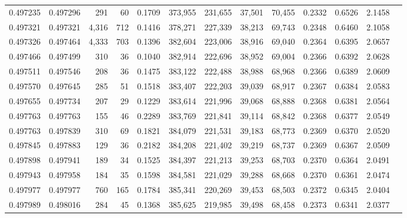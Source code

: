 \begin{tabular}{rrrrrrrrrrrrr}
0.497235 & 0.497296 &   291 &    60 &                                     0.1709 & 373,955 & 231,655 &  37,501 &  70,455 & 0.2332 & 0.6526 & 2.1458 \\
0.497321 & 0.497321 & 4,316 &   712 &                                     0.1416 & 378,271 & 227,339 &  38,213 &  69,743 & 0.2348 & 0.6460 & 2.1058 \\
0.497326 & 0.497464 & 4,333 &   703 &                                     0.1396 & 382,604 & 223,006 &  38,916 &  69,040 & 0.2364 & 0.6395 & 2.0657 \\
0.497466 & 0.497499 &   310 &    36 &                                     0.1040 & 382,914 & 222,696 &  38,952 &  69,004 & 0.2366 & 0.6392 & 2.0628 \\
0.497511 & 0.497546 &   208 &    36 &                                     0.1475 & 383,122 & 222,488 &  38,988 &  68,968 & 0.2366 & 0.6389 & 2.0609 \\
0.497570 & 0.497645 &   285 &    51 &                                     0.1518 & 383,407 & 222,203 &  39,039 &  68,917 & 0.2367 & 0.6384 & 2.0583 \\
0.497655 & 0.497734 &   207 &    29 &                                     0.1229 & 383,614 & 221,996 &  39,068 &  68,888 & 0.2368 & 0.6381 & 2.0564 \\
0.497763 & 0.497763 &   155 &    46 &                                     0.2289 & 383,769 & 221,841 &  39,114 &  68,842 & 0.2368 & 0.6377 & 2.0549 \\
0.497763 & 0.497839 &   310 &    69 &                                     0.1821 & 384,079 & 221,531 &  39,183 &  68,773 & 0.2369 & 0.6370 & 2.0520 \\
0.497845 & 0.497883 &   129 &    36 &                                     0.2182 & 384,208 & 221,402 &  39,219 &  68,737 & 0.2369 & 0.6367 & 2.0509 \\
0.497898 & 0.497941 &   189 &    34 &                                     0.1525 & 384,397 & 221,213 &  39,253 &  68,703 & 0.2370 & 0.6364 & 2.0491 \\
0.497943 & 0.497958 &   184 &    35 &                                     0.1598 & 384,581 & 221,029 &  39,288 &  68,668 & 0.2370 & 0.6361 & 2.0474 \\
0.497977 & 0.497977 &   760 &   165 &                                     0.1784 & 385,341 & 220,269 &  39,453 &  68,503 & 0.2372 & 0.6345 & 2.0404 \\
0.497989 & 0.498016 &   284 &    45 &                                     0.1368 & 385,625 & 219,985 &  39,498 &  68,458 & 0.2373 & 0.6341 & 2.0377 \\

\end{tabular}
